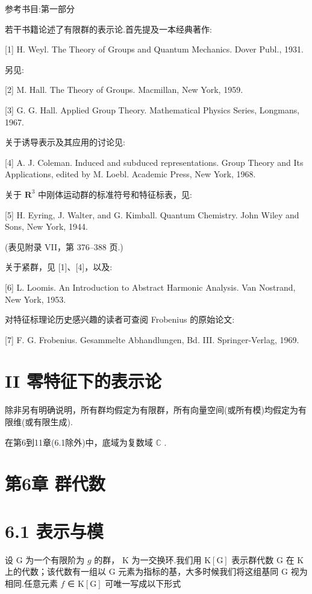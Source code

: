 \documentclass[10pt]{article}
\begin{document}
参考书目:第一部分

若干书籍论述了有限群的表示论.首先提及一本经典著作:

[1] H. Weyl. The Theory of Groups and Quantum Mechanics. Dover Publ., 1931.

另见:

[2] M. Hall. The Theory of Groups. Macmillan, New York, 1959.

[3] G. G. Hall. Applied Group Theory. Mathematical Physics Series, Longmans, 1967.

关于诱导表示及其应用的讨论见:

[4] A. J. Coleman. Induced and subduced representations. Group Theory and Its Applications, edited by M. Loebl. Academic Press, New York, 1968.

关于 \({\mathbf{R}}^{3}\) 中刚体运动群的标准符号和特征标表，见:

[5] H. Eyring, J. Walter, and G. Kimball. Quantum Chemistry. John Wiley and Sons, New York, 1944.

(表见附录 VII，第 376–388 页.)

关于紧群，见 [1]、[4]，以及:

[6] L. Loomis. An Introduction to Abstract Harmonic Analysis. Van Nostrand, New York, 1953.

对特征标理论历史感兴趣的读者可查阅 Frobenius 的原始论文:

[7] F. G. Frobenius. Gesammelte Abhandlungen, Bd. III. Springer-Verlag, 1969.

\section*{II 零特征下的表示论}

除非另有明确说明，所有群均假定为有限群，所有向量空间(或所有模)均假定为有限维(或有限生成).

在第6到11章(6.1除外)中，底域为复数域 \(\mathbb{C}\) .

\section*{第6章 群代数}

\section*{6.1 表示与模}

设 \(\mathrm{G}\) 为一个有限阶为 \(g\) 的群， \(\mathrm{K}\) 为一交换环.我们用 \(\mathrm{K}\left\lbrack  \mathrm{G}\right\rbrack\) 表示群代数 \(\mathrm{G}\) 在 \(\mathrm{K}\) 上的代数；该代数有一组以 \(\mathrm{G}\) 元素为指标的基，大多时候我们将这组基同 \(\mathrm{G}\) 视为相同.任意元素 \(f\) ∈ \(\mathrm{K}\left\lbrack  \mathrm{G}\right\rbrack\) 可唯一写成以下形式
\end{document}
